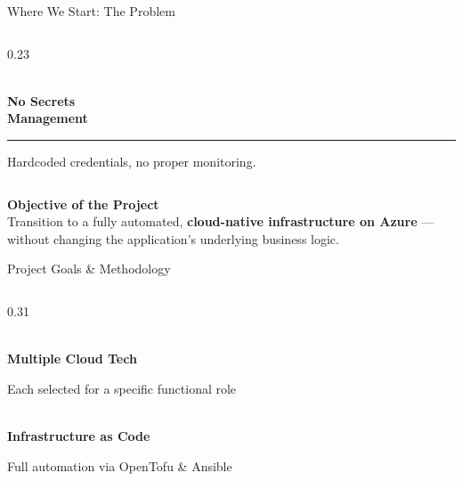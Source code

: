 {\begin{frame}{Where We Start: The Problem}
\begin{columns}[T, totalwidth=\textwidth]
  \begin{column}{0.23\textwidth}
    \begin{tcolorbox}[problemcard=HUAblue]
      \centering
      {\color{problemorange}\faKey}\\[4pt]
      {\color{HUAblue}\bfseries\scriptsize No Secrets\\[-2pt]Management}
      \vspace{4pt}
      \hrule
      \vspace{4pt}
      \raggedright\tiny
      Hardcoded credentials, no proper monitoring.
    \end{tcolorbox}
  \end{column}
\end{columns}

\vspace{0.3cm}

\begin{tcolorbox}[
  enhanced, boxrule=0pt,
  colback=HUAblue!10, colframe=HUAblue!10,
  arc=4pt, left=8pt, right=8pt, top=5pt, bottom=5pt,
  borderline west={4pt}{0pt}{HUAblue},
]
  {\color{HUAblue}\bfseries\small \faRocket\quad Objective of the Project}
  \vspace{4pt}\\
  \footnotesize
  Transition to a fully automated, \textbf{cloud-native infrastructure on Azure} — without changing the application's underlying business logic.
\end{tcolorbox}

\end{frame}


\begin{frame}{Project Goals \& Methodology}

\vspace{0.3cm}

\begin{columns}[T, totalwidth=\textwidth]
  
  \begin{column}{0.31\textwidth}
    \begin{tcolorbox}[goalcard]
      \goalicon{\faLayerGroup}\\[4pt]
      {\color{HUAblue}\bfseries\scriptsize Multiple Cloud Tech}\\
      \raggedright\tiny Each selected for a specific functional role
    \end{tcolorbox}
    \vspace{0.1cm}
    \begin{tcolorbox}[goalcard]
      \goalicon{\faServer}\\[4pt]
      {\color{HUAblue}\bfseries\scriptsize Infrastructure as Code}\\
      \raggedright\tiny Full automation via OpenTofu \& Ansible
    \end{tcolorbox}
  \end{column}


\end{columns}
\end{frame}}
